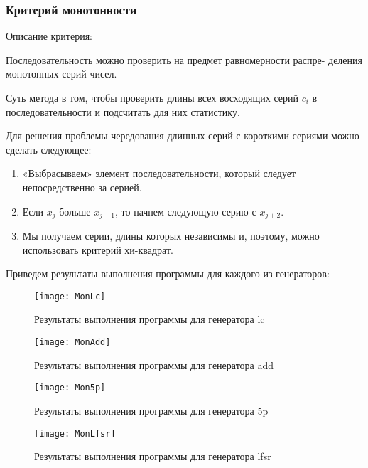 \documentclass[bachelor, och, coursework]{shiza}
\begin{document}
	\subsubsection{Критерий монотонности}
	
	Описание критерия:
	
	Последовательность можно проверить на предмет равномерности распре-
	деления монотонных серий чисел.
	
	Суть метода в том, чтобы проверить длины всех восходящих серий $c_i$ в последовательности и подсчитать для них статистику.
	
	Для решения проблемы чередования длинных серий с короткими сериями можно сделать следующее: 
	
	\begin{enumerate}
		\item «Выбрасываем» элемент последовательности, который следует непосредственно за серией.
		\item Если $x_j$  больше $x_{j+1}$, то начнем следующую серию с $x_{j+2}$.
		\item Мы получаем серии, длины которых независимы и, поэтому, можно использовать критерий хи-квадрат.
	\end{enumerate}
	
	Приведем результаты выполнения программы для каждого из генераторов:
	
	\begin{figure}[H]
		\centering
		\texttt{[image: MonLc]}
		\caption{Результаты выполнения программы для генератора lc}
		\label{fig:MonLc}
	\end{figure}
	
	\begin{figure}[H]
		\centering
		\texttt{[image: MonAdd]}
		\caption{Результаты выполнения программы для генератора add}
		\label{fig:MonAdd}
	\end{figure}
	
	\begin{figure}[H]
		\centering
		\texttt{[image: Mon5p]}
		\caption{Результаты выполнения программы для генератора 5p}
		\label{fig:Mon5p}
	\end{figure}	
	
	\begin{figure}[H]
		\centering
		\texttt{[image: MonLfsr]}
		\caption{Результаты выполнения программы для генератора lfsr}
		\label{fig:MonLfsr}
	\end{figure}
	
\end{document}
